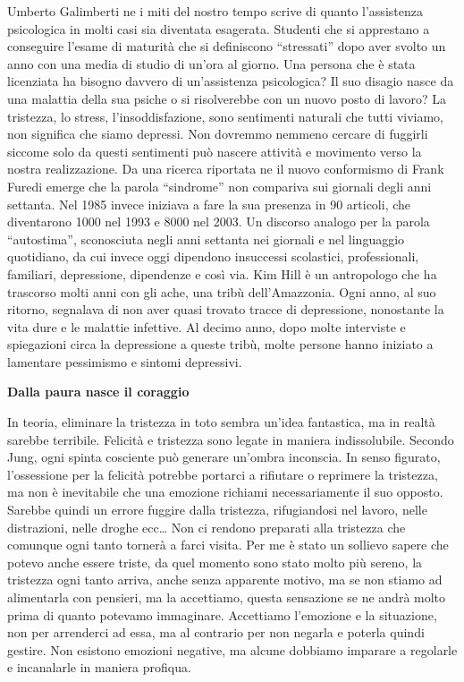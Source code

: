 \documentclass[12pt]{book} %
\begin{document}
\begin{mdframed}[linewidth=1pt]
Umberto Galimberti ne i miti del nostro tempo scrive di quanto
l'assistenza psicologica in molti casi sia diventata esagerata. Studenti che si apprestano a
conseguire l'esame di maturità che si definiscono “stressati” dopo aver svolto un anno con una
media di studio di un'ora al giorno. Una persona che è stata licenziata ha bisogno davvero di
un'assistenza psicologica? Il suo disagio nasce da una malattia della sua psiche o si risolverebbe
con un nuovo posto di lavoro? La tristezza, lo stress, l'insoddisfazione, sono sentimenti naturali
che tutti viviamo, non significa che siamo depressi. Non dovremmo nemmeno cercare di fuggirli siccome solo da questi
sentimenti può nascere attività e movimento verso la nostra realizzazione. Da una ricerca riportata ne il nuovo
conformismo di Frank
Furedi emerge che la parola “sindrome” non compariva sui giornali degli anni settanta. Nel 1985 invece iniziava a fare
la sua presenza in 90 articoli, che diventarono 1000 nel 1993 e 8000 nel 2003. Un discorso analogo per la parola
“autostima”, sconosciuta negli anni settanta nei giornali e nel linguaggio quotidiano, da cui invece oggi dipendono
insuccessi scolastici, professionali, familiari, depressione, dipendenze e così via. Kim Hill è un
antropologo che ha trascorso molti anni con gli ache, una tribù dell'Amazzonia. Ogni anno, al suo
ritorno, segnalava di non aver quasi trovato tracce di depressione, nonostante la vita dure e le malattie infettive. Al
decimo anno, dopo molte interviste e spiegazioni circa la depressione a queste tribù, molte persone hanno iniziato a
lamentare pessimismo e sintomi depressivi.
\end{mdframed}

\textbf{Dalla paura nasce il coraggio}

In teoria, eliminare la tristezza in toto sembra un'idea fantastica, ma in realtà sarebbe terribile. Felicità e
tristezza sono legate in maniera indissolubile. 
Secondo Jung, ogni spinta cosciente può generare un’ombra inconscia. In senso figurato, l’ossessione per la felicità potrebbe portarci a rifiutare o reprimere la tristezza, ma non è inevitabile che una emozione richiami necessariamente il suo opposto. Sarebbe quindi un errore fuggire dalla tristezza,
rifugiandosi nel lavoro, nelle distrazioni, nelle droghe ecc… Non ci rendono preparati alla tristezza che comunque ogni
tanto tornerà a farci visita. Per me è stato un sollievo sapere che potevo anche essere triste, da quel momento sono
stato molto più sereno, la tristezza ogni tanto arriva, anche senza apparente motivo, ma se non stiamo ad alimentarla
con pensieri, ma la accettiamo, questa sensazione se ne andrà molto prima di quanto potevamo immaginare. Accettiamo
l'emozione e la situazione, non per arrenderci ad essa, ma al contrario per non negarla e poterla quindi gestire.
Non esistono emozioni negative, ma alcune dobbiamo imparare a regolarle e incanalarle in maniera profiqua.
\end{document}
